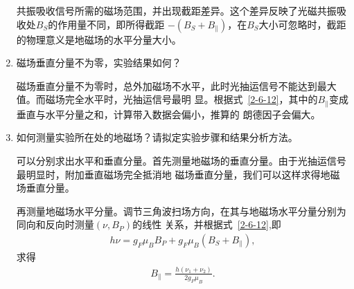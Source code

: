 \documentclass[11pt,a4paper]{article}
\begin{document}
\begin{spacing}{1.3}
\begin{CJK*}{UTF8}{gbsn}
\begin{enumerate}
共振吸收信号所需的磁场范围，并出现截距差异。这个差异反映了光磁共振吸收处$B_S$的作用量不同，即所得截距
$-(B_S+B_{\parallel})$，在$B_S$大小可忽略时，截距的物理意义是地磁场的水平分量大小。
\item  磁场垂直分量不为零，实验结果如何？\par 
磁场垂直分量不为零时，总外加磁场不水平，此时光抽运信号不能达到最大值。而磁场完全水平时，光抽运信号最明
显。根据式~\eqref{2-6-12}，其中的$B_{\parallel}$变成垂直与水平分量之和，计算带入数据会偏小，推算的
朗德因子会偏大。
\item  如何测量实验所在处的地磁场？请拟定实验步骤和结果分析方法。\par
可以分别求出水平和垂直分量。首先测量地磁场的垂直分量。由于光抽运信号最明显时，附加垂直磁场完全抵消地
磁场垂直分量，我们可以这样求得地磁场垂直分量。\par 
再测量地磁场水平分量。调节三角波扫场方向，在其与地磁场水平分量分别为同向和反向时测量$(\nu,B_P)$的线性
关系，并根据式~\eqref{2-6-12},即
\begin{eqnarray} 
h\nu=g_F\mu_BB_P+g_F\mu_B(B_S+B_{\parallel}),
\end{eqnarray}
求得
\begin{eqnarray} 
B_{\parallel}=\frac{h(\nu_1+\nu_2)}{2 g_F\mu_B}.
\end{eqnarray}
\end{enumerate}





\end{CJK*}
\end{spacing}
\end{document}
